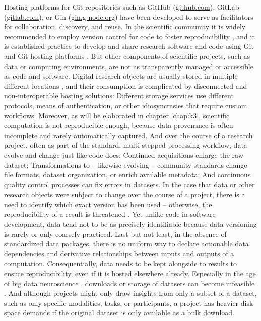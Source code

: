 Hosting platforms for Git repositories such as GitHub (\url{github.com}), GitLab ({\url{gitlab.com}), or Gin (\url{gin.g-node.org}) have been developed to serve as facilitators for collaboration, discovery, and reuse.
In the scientific community it is widely recommended to employ version control for code to foster reproducibility \citep[e.g.,][]{sandve2013ten}, and it is established practice to develop and share research software and code using Git and Git hosting platforms \citep[e.g.,][]{nord2019towards, strupler2017reproducibility, bryan2018excuse, corti2019managing}.
But other components of scientific projects, such as data or computing environments, are not as transparently managed or accessible as code and software.
Digital research objects are usually stored in multiple different locations \citep{parsons2013research}, and their consumption is complicated by disconnected and non-interoperable hosting solutions:
Different storage services use different protocols, means of authentication, or other idiosyncrasies that require custom workflows.
Moreover, as will be elaborated in chapter \ref{chap:k3}, scientific computation is not reproducible enough, because data provenance is often incomplete and rarely automatically captured.
And over the course of a research project, often as part of the standard, multi-stepped processing workflow, data evolve and change just like code does:
Continued acquisitions enlarge the raw dataset; Transformations to -- likewise evolving -- community standards change file formats, dataset organization, or enrich available metadata; And continuous quality control processes can fix errors in datasets.
In the case that data or other research objects were subject to change over the course of a project, there is a need to identify which exact version has been used -- otherwise, the reproducibility of a result is threatened \citep{hardwicke2018data}.
Yet unlike code in software development, data tend not to be as precisely identifiable because data versioning is rarely or only coarsely practiced.
Last but not least, in the absence of standardized data packages, there is no uniform way to declare actionable
data dependencies and derivative relationships between inputs and outputs of a computation.
Consequentially, data needs to be kept alongside to results to ensure reproducibility, even if it is hosted elsewhere already.
Especially in the age of big data neuroscience \citep{bzdok2017inference}, downloads or storage of datasets can become infeasible \citep{horien2021hitchhiker, grisham2016proposed}.
And although projects might only draw insights from only a subset of a dataset, such as only specific modalities, tasks, or participants, a project has heavier disk space demands if the original dataset is only available as a bulk download.\\
}
